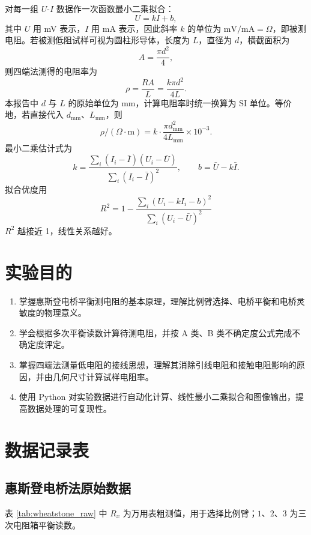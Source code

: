 \documentclass[UTF8,a4paper,12pt]{ctexart}
\begin{document}
对每一组 $U$-$I$ 数据作一次函数最小二乘拟合：
\begin{equation}
  U=kI+b,
\end{equation}
其中 $U$ 用 mV 表示，$I$ 用 mA 表示，因此斜率 $k$ 的单位为 $\mathrm{mV/mA}=\Omega$，即被测电阻。若被测低阻试样可视为圆柱形导体，长度为 $L$，直径为 $d$，横截面积为
\begin{equation}
  A=\frac{\pi d^2}{4},
\end{equation}
则四端法测得的电阻率为
\begin{equation}
  \rho=\frac{RA}{L}=\frac{k\pi d^2}{4L}.
\end{equation}
本报告中 $d$ 与 $L$ 的原始单位为 mm，计算电阻率时统一换算为 SI 单位。等价地，若直接代入 $d_{\mathrm{mm}}$、$L_{\mathrm{mm}}$，则
\begin{equation}
  \rho/(\Omega\cdot\mathrm{m})=k\cdot \frac{\pi d_{\mathrm{mm}}^2}{4L_{\mathrm{mm}}}\times 10^{-3}.
\end{equation}
最小二乘估计式为
\begin{equation}
  k=\frac{\sum_i(I_i-\bar I)(U_i-\bar U)}{\sum_i(I_i-\bar I)^2},\qquad
  b=\bar U-k\bar I .
\end{equation}
拟合优度用
\begin{equation}
  R^2=1-\frac{\sum_i(U_i-kI_i-b)^2}{\sum_i(U_i-\bar U)^2}
\end{equation}
$R^2$ 越接近 1，线性关系越好。

\section{实验目的}
\begin{enumerate}
  \item 掌握惠斯登电桥平衡测电阻的基本原理，理解比例臂选择、电桥平衡和电桥灵敏度的物理意义。
  \item 学会根据多次平衡读数计算待测电阻，并按 A 类、B 类不确定度公式完成不确定度评定。
  \item 掌握四端法测量低电阻的接线思想，理解其消除引线电阻和接触电阻影响的原因，并由几何尺寸计算试样电阻率。
  \item 使用 Python 对实验数据进行自动化计算、线性最小二乘拟合和图像输出，提高数据处理的可复现性。
\end{enumerate}

\section{数据记录表}

\subsection{惠斯登电桥法原始数据}
表 \ref{tab:wheatstone_raw} 中 $R_x$ 为万用表粗测值，用于选择比例臂；$1$、$2$、$3$ 为三次电阻箱平衡读数。
\end{document}
